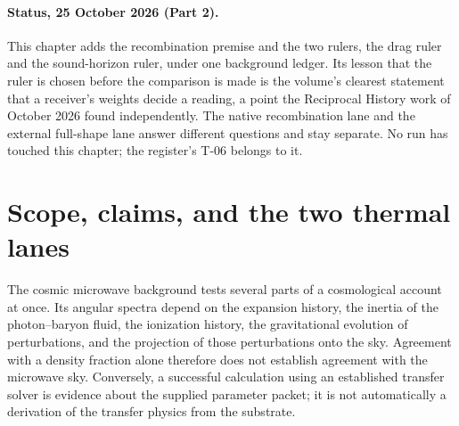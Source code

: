 \begin{abstract}
This chapter expands the thermal-history and microwave-background test of the selected SAM inventory. It separates internally implemented hydrogen transport from the standard-physics full-spectrum lane, derives the optical-depth and acoustic bookkeeping, preserves the reported numerical receipts, and corrects their evidential interpretation. The remaining obligations are a converged recombination calculation, a unique drag ruler, a governing perturbation law, and fully specified likelihood comparisons. The native receipt remains a percent-level calculation with documented atomic and time-variable corrections. The full-shape receipts are compatibility checks of a selected packet under inherited transfer physics, rather than independent derivations of that physics. The published second-peak comparator is corrected, and the ACT temperature residual is retained explicitly. New analytical diagnostics distinguish moving recombination endpoints from background-integral changes and show why a visibility peak alone cannot certify the entire ionization history. No historical simulation or likelihood is rerun in this expansion; the numerical execution evidence still required is listed alongside clear validation and failure conditions.
\end{abstract}

\paragraph*{Status, 25 October 2026 (Part 2).} This chapter adds the recombination premise and the two rulers, the drag ruler and the sound-horizon ruler, under one background ledger. Its lesson that the ruler is chosen before the comparison is made is the volume's clearest statement that a receiver's weights decide a reading, a point the Reciprocal History work of October 2026 found independently. The native recombination lane and the external full-shape lane answer different questions and stay separate. No run has touched this chapter; the register's T-06 belongs to it.


\section{Scope, claims, and the two thermal lanes}

The cosmic microwave background tests several parts of a cosmological account at once. Its angular spectra depend on the expansion history, the inertia of the photon--baryon fluid, the ionization history, the gravitational evolution of perturbations, and the projection of those perturbations onto the sky. Agreement with a density fraction alone therefore does not establish agreement with the microwave sky. Conversely, a successful calculation using an established transfer solver is evidence about the supplied parameter packet; it is not automatically a derivation of the transfer physics from the substrate.

